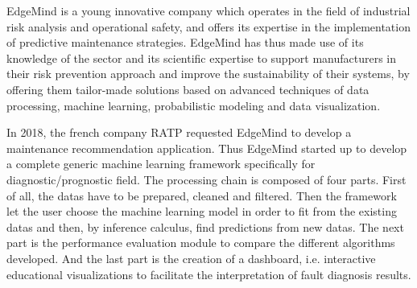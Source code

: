 
EdgeMind is a young innovative company which operates in the field of industrial risk analysis and operational safety, and offers its expertise in the implementation of predictive maintenance strategies. EdgeMind has thus made use of its knowledge of the sector and its scientific expertise to support manufacturers in their risk prevention approach and improve the sustainability of their systems, by offering them tailor-made solutions based on advanced techniques of data processing, machine learning, probabilistic modeling and data visualization.

In 2018, the french company RATP requested EdgeMind to develop a maintenance recommendation application. Thus EdgeMind started up to develop a complete generic machine learning framework specifically for diagnostic/prognostic field. The processing chain is composed of four parts. First of all, the datas have to be prepared, cleaned and filtered. Then the framework let the user choose the machine learning model in order to fit from the existing datas and then, by inference calculus, find predictions from new datas. The next part is the performance evaluation module to compare the different algorithms developed. And the last part is the creation of a dashboard, i.e. interactive educational visualizations to facilitate the interpretation of fault diagnosis results.
